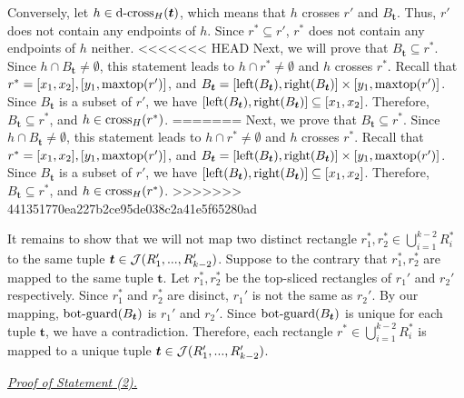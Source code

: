 \vgap 

Conversely, let $h\in \mathrm{d\text{-}cross}_H(\textrm{\boldmath${t}$})$, which means that $h$ crosses $r'$ and $B_{\bm{t}}$. Thus, $r'$ does not contain any endpoints of $h$. Since $r^*\subseteq r'$, $r^*$ does not contain any endpoints of $h$ neither. 
<<<<<<< HEAD
Next, we will prove that $B_{\bm{t}} \subseteq r^*$. Since $h \cap B_{\bm{t}}\neq \emptyset$, this statement leads to $h \cap r^* \neq \emptyset$ and $h$ crosses $r^*$. Recall that $r^* = [x_1,x_2], [y_1, \mathrm{maxtop}(r')]$, and $B_{\textrm{\boldmath${t}$}} = [\mathrm{left}(B_{\textrm{\boldmath${t}$}}), \mathrm{right}(B_{\textrm{\boldmath${t}$}})]\times [y_1,\mathrm{maxtop}(r')]$. Since $B_{\bm{t}}$ is a subset of $r'$, we have $[\mathrm{left}(B_{\textrm{\boldmath${t}$}}), \mathrm{right}(B_{\textrm{\boldmath${t}$}})] \subseteq [x_1,x_2]$. Therefore, $B_{\bm{t}} \subseteq r^*$, and $h\in \mathrm{cross}_H(r^*)$. 
=======
Next, we prove that $B_{\bm{t}} \subseteq r^*$. Since $h \cap B_{\bm{t}}\neq \emptyset$, this statement leads to $h \cap r^* \neq \emptyset$ and $h$ crosses $r^*$. Recall that $r^* = [x_1,x_2], [y_1, \mathrm{maxtop}(r')]$, and $B_{\textrm{\boldmath${t}$}} = [\mathrm{left}(B_{\textrm{\boldmath${t}$}}), \mathrm{right}(B_{\textrm{\boldmath${t}$}})]\times [y_1,\mathrm{maxtop}(r')]$. Since $B_{\bm{t}}$ is a subset of $r'$, we have $[\mathrm{left}(B_{\textrm{\boldmath${t}$}}), \mathrm{right}(B_{\textrm{\boldmath${t}$}})] \subseteq [x_1,x_2]$. Therefore, $B_{\bm{t}} \subseteq r^*$, and $h\in \mathrm{cross}_H(r^*)$. 
>>>>>>> 441351770ea227b2ce95de038c2a41e5f65280ad

\vgap 

It remains to show that we will not map two distinct rectangle $r_1^*, r_2^*\in \bigcup_{i = 1}^{k-2}R_i^*$ to the same tuple $\textrm{\boldmath${t}$}\in \mathcal{J}(R_1',...,R_{k-2}')$. Suppose to the contrary that $r_1^*, r_2^*$ are mapped to the same tuple $\bm{t}$. Let $r_1^*, r_2^*$ be the top-sliced rectangles of $r_1'$ and $r_2'$ respectively. Since $r_1^*$ and $r_2^*$ are disinct, $r_1'$ is not the same as $r_2'$. By our mapping, $\mathrm{bot\text{-}guard}(B_{\textrm{\boldmath${t}$}})$ is $r_1'$ and $r_2'$. Since $\mathrm{bot\text{-}guard}(B_{\textrm{\boldmath${t}$}})$ is unique for each tuple $\bm{t}$, we have a contradiction. Therefore, each rectangle $r^*\in \bigcup_{i = 1}^{k-2}R_i^*$ is mapped to a unique tuple $\textrm{\boldmath${t}$}\in \mathcal{J}(R_1',...,R_{k-2}')$.

\noindent \underline{\em Proof of Statement (2).} 

